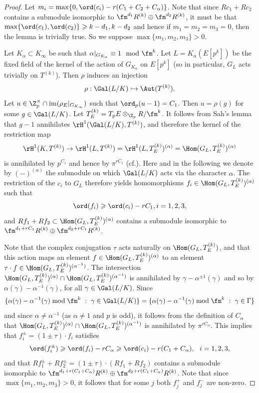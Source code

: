 \begin{proof}
Let $m_i = \max\{0,\ord(c_i) - r(C_1+C_2+C_{\alpha})\}$.
Note that since $R c_1 + R c_2$ contains a submodule isomorphic to $\fm^{d_1}R^{(k)}\oplus \fm^{d_2}R^{(k)}$,
it must be that $\max\{\ord(c_1),\ord(c_2)\}\geqslant k-d_1,k-d_2$ and hence
if $m_1=m_2=m_3=0$,
then the lemma is trivially true. So we suppose $\max\{m_1,m_2,m_3\}>0$.

Let $K_{\alpha}\subset K_{\infty}$ be such that $\alpha|_{G_{K_\alpha}}\equiv 1 \mod \fm^k$.
Let $L=K_{\alpha}(E[p^k])$ be the fixed field of the kernel of the action of $G_{K_\alpha}$ on
$E[p^k]$ (so in particular, $G_L$ acts trivially on $T^{(k)}$).
Then $\rho$ induces an injection
\[
\rho: \Gal(L/K)\hookrightarrow \Aut(T^{(k)}).
\]
Let $u\in \Z_p^\times\cap\mathrm{im}(\rho_E|_{G_{K_\infty}})$ such that $\ord_p(u-1) = C_1$.
Then $u = \rho(g)$ for some $g\in \Gal(L/K)$. Let $T_{E}^{(k)} = T_pE\otimes_{\Z_p} R/\fm^k$.
It follows from Sah's lemma that $g-1$ annihilates $\rH^1(\Gal(L/K), T^{(k)})$, and therefore the kernel of the restriction map
$$
\rH^1(K,T^{(k)})\rightarrow \rH^1(L,T^{(k)})= \rH^1(L,T_{E}^{(k)})^{(\alpha)}=\Hom(G_L,T_{E}^{(k)})^{(\alpha)}
$$
is annihilated by $p^{C_1}$ and hence by $\pi^{rC_1}$ (cf.\cite[Prop.~(6.1.2)]{nekovar}).
Here and in the following we denote by $(-)^{(\alpha)}$ the submodule on which $\Gal(L/K)$ acts via the character $\alpha$.
The restriction of the $c_i$ to $G_L$ therefore yields homomorphisms $f_i \in \Hom(G_L,T_E^{(k)})^{(\alpha)}$ such that
$$
\ord(f_i) \geqslant \ord(c_i) - rC_1, i=1,2,3,
$$
and $Rf_1+Rf_2\subset \Hom(G_L,T_E^{(k)})^{(\alpha)}$ contains a submodule isomorphic to
$\fm^{d_1+rC_1}R^{(k)}\oplus \fm^{d_2+rC_1}R^{(k)}$.

Note that the complex conjugation $\tau$ acts naturally on $\Hom(G_L,T_E^{(k)})$,
and that this action maps an element $f\in\Hom(G_L,T_E^{(k)})^{(\alpha)}$ to an element $\tau\cdot f\in \Hom(G_L,T_E^{(k)})^{(\alpha^{-1})}$.
The intersection $\Hom(G_L,T_E^{(k)})^{(\alpha)}\cap \Hom(G_L,T_E^{(k)})^{(\alpha^{-1})}$
is annihilated by $\gamma-\alpha^{\pm 1}(\gamma)$ and so by $\alpha(\gamma)-\alpha^{-1}(\gamma)$, for all $\gamma\in\Gal(L/K)$.
Since
\[
\{\alpha(\gamma)-\alpha^{-1}(\gamma)\;{\rm mod}\;\fm^k \ : \ \gamma\in\Gal(L/K)\} = \{\alpha(\gamma)-\alpha^{-1}(\gamma)\;{\rm mod}\;\fm^k \ : \ \gamma\in\Gamma\}
\]
and since
$\alpha\neq \alpha^{-1}$ (as $\alpha\neq 1$ and $p$ is odd),
it follows from the definition of $C_\alpha$ that  $\Hom(G_L,T_E^{(k)})^{(\alpha)}\cap \Hom(G_L,T_E^{(k)})^{(\alpha^{-1})}$ is annihilated by $\pi^{rC_\alpha}$. This implies that
$f_i^\pm = (1\pm \tau)\cdot f_i$ satisfies
$$
\ord(f_i^\pm) \geqslant \ord(f_i) - rC_\alpha\geqslant{\ord(c_i)-r(C_1+C_\alpha)}, \ \ i=1,2,3,
$$
and that $Rf_1^\pm +R f_2^\pm = (1\pm\tau)\cdot(Rf_1+Rf_2)$ contains a submodule isomorphic to
$\fm^{d_1+r(C_1+C_\alpha)}R^{(k)}\oplus \fm^{d_2+r(C_1+C_\alpha)}R^{(k)}$.
Note that since $\max\{m_1,m_2,m_3\}>0$, it follows that for some $j$ both $f_j^+$ and $f_j^-$ are non-zero.


\end{proof}
